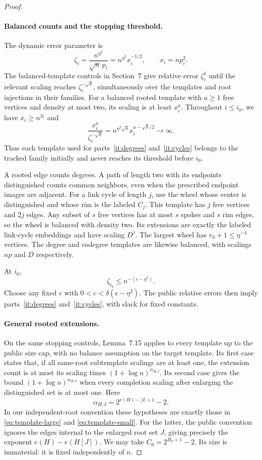 \begin{proof}
\paragraph{Balanced counts and the stopping threshold.}
The dynamic error parameter is
\[
 \zeta_i=\frac{n^{\eta^2}}{\sqrt n\,p_i}
         =n^{\eta^2}x_i^{-1/2},\qquad x_i=np_i^2.
\]
The balanced-template controls in Section~7 give relative error
$\zeta_i^\delta$ until the relevant scaling reaches
$\zeta_i^{-\sqrt\delta}$, simultaneously over the templates and root
injections in their families. For a balanced rooted template with
$a\ge1$ free vertices and density at most two, its scaling is at least
$x_i^a$. Throughout $i\le i_0$, we have $x_i\ge n^{2\epsilon}$ and
\[
 \frac{x_i^a}{\zeta_i^{-\sqrt\delta}}
  =n^{\eta^2\sqrt\delta}x_i^{a-\sqrt\delta/2}
  \longrightarrow\infty.
\]
Thus each template used for parts~\ref{it:degrees} and~\ref{it:cycles}
belongs to the tracked family initially and never reaches its threshold
before $i_0$.

A rooted edge counts degrees. A path of length two with its endpoints
distinguished counts common neighbors, even when the prescribed endpoint
images are adjacent. For a link cycle of length $j$, use the wheel whose
center is distinguished and whose rim is the labeled $C_j$. This template
has $j$ free vertices and $2j$ edges. Any subset of $s$ free vertices has
at most $s$ spokes and $s$ rim edges, so the wheel is balanced with density
two. Its extensions are exactly the labeled link-cycle embeddings and
have scaling $D^j$. The largest wheel has $r_0+1\le\eta^{-4}$ vertices.
The degree and codegree templates are likewise balanced, with scalings
$np$ and $D$ respectively.

At $i_0$,
\[
 \zeta_{i_0}\le n^{-(\epsilon-\eta^2)}.
\]
Choose any fixed $c$ with
$0<c<\delta(\epsilon-\eta^2)$. The public relative errors then imply
parts~\ref{it:degrees} and~\ref{it:cycles}, with slack for fixed constants.

\paragraph{General rooted extensions.}
On the same stopping controls, Lemma~7.15 applies to every template up
to the public size cap, with no balance assumption on the target
template. Its first case states that, if all same-root subtemplate
scalings are at least one, the extension count is at most its scaling
times $(1+\log n)^{\alpha_{H,I}}$. Its second case gives the bound
$(1+\log n)^{\alpha_{H,I}}$ when every completion scaling after enlarging
the distinguished set is at most one. Here
\[
 \alpha_{H,I}=2^{v(H)-|I|+1}-2.
\]
In our independent-root convention these hypotheses are exactly those
in \eqref{eq:template-large} and \eqref{eq:template-small}. For the latter,
the public convention ignores the edges internal to the enlarged root
set $J$, giving precisely the exponent $e(H)-e(H[J])$.
We may take $C_0=2^{H_0+1}-2$. Its size is immaterial: it is fixed
independently of $n$.


\end{proof}
